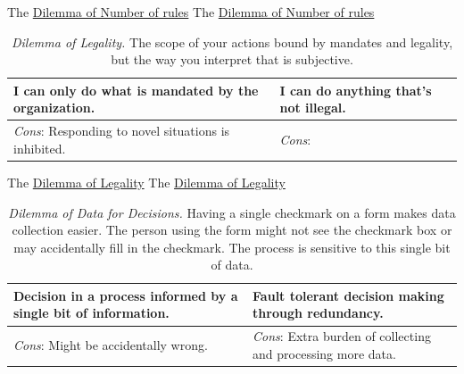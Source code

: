 The \href{table:number_of_rules}{Dilemma of Number of rules}
The \href{table:number_of_rules}{Dilemma of Number of rules}


\begin{center}
\begin{table}[H] %
\begin{tabular}{ | m{\dilemmatablewidth}| m{\dilemmatablewidth} | } 
  \hline
  \textbf{I can only do what is mandated by the organization.} & 
  \textbf{I can do anything that's not illegal.} \\ 
  \hline
  \textit{Cons}: Responding to novel situations is inhibited. &
  \textit{Cons}:  \\  
  \hline
\end{tabular}
\caption{
\textit{Dilemma of Legality.}
The scope of your actions bound by mandates and legality, but the way you interpret that is subjective.
}
\label{table:legality}
\end{table}
\end{center}

The \href{table:legality}{Dilemma of Legality}
The \href{table:legality}{Dilemma of Legality}


\begin{center}
\begin{table}[H] %
\begin{tabular}{ | m{\dilemmatablewidth}| m{\dilemmatablewidth} | } 
  \hline
  \textbf{Decision in a process informed by a single bit of information.} & 
  \textbf{Fault tolerant decision making through redundancy.} \\ 
  \hline
  \textit{Cons}: Might be accidentally wrong. &
  \textit{Cons}: Extra burden of collecting and processing more data. \\  
  \hline
\end{tabular}
\caption{
\textit{Dilemma of Data for Decisions.}
Having a single checkmark on a form makes data collection easier. The person using the form might not see the checkmark box or may accidentally fill in the checkmark. The process is sensitive to this single bit of data.
}
\label{table:single-bit-decision}
\end{table}
\end{center}

